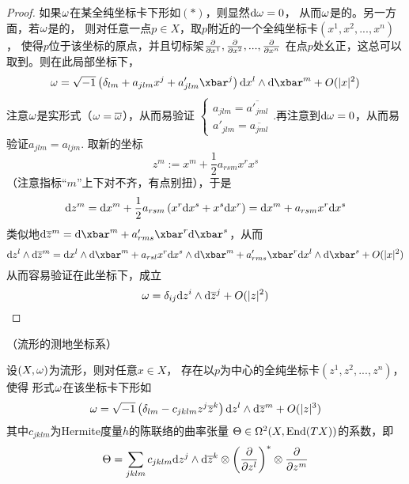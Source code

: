 
\begin{proof}
如果$\omega$在某全纯坐标卡下形如$(*)$，则显然$\mathrm{d}\omega=0$，
从而$\omega$是\Kahler 的。另一方面，若$\omega$是\Kahler 的，
则对任意一点$p\in X$，取$p$附近的一个全纯坐标卡$(x^1,x^2,...,x^n)$，
使得$p$位于该坐标的原点，并且切标架$\frac{\partial } {\partial x^1},\frac{\partial } {\partial x^2},...,\frac{\partial } {\partial x^n}$
在点$p$处幺正，这总可以取到。则在此局部坐标下，
$$
  \omg
=
  \ii\left(
    \delta_{lm}
   +a_{jlm}x^j
   +a_{jlm}'\xbar^j
  \right)
  \td x^l\wedge\td\xbar^m
  +O(|x|^2)
$$
注意$\omega$是实形式（$\omega=\overline{\omega}$），从而易验证
$
  \left\{
    \begin{array}{l}
      a_{jlm}=\overline{a'_{jml}}\\
      a'_{jlm}=\overline{a_{jml}}
    \end{array}
  \right.
$.再注意到$\mathrm{d}\omega=0$，从而易验证$a_{jlm}=a_{ljm}$.
取新的坐标
$$z^m:=x^m+\frac{1}{2}a_{rsm}x^rx^s$$
（注意指标“$m$”上下对不齐，有点别扭），于是
$$
  \mathrm{d} z^m=\mathrm{d} x^m+\frac{1}{2}
  a_{rsm}\left(x^r\mathrm{d} x^s+x^s\mathrm{d} x^r\right)
=
  \mathrm{d} x^m+a_{rsm}x^r\mathrm{d} x^s
$$
类似地$\td\zbar^m=\td\xbar^m+a'_{rms}\xbar^r\td\xbar^s$，从而
$$
  \td z^l\wedge\td\zbar^m
=
  \td x^l\wedge\td\xbar^m
 +a_{rsl}x^r\td x^s\wedge\td\xbar^m
 +a_{rms}'\xbar^r\td x^l\wedge\td\xbar^s+O(|x|^2)
$$
从而容易验证在此坐标下，成立
$$\omega=\delta_{ij}\mathrm{d} z^i\wedge\mathrm{d}\overline{z}^j+O(|z|^2)$$
\end{proof}


\begin{prop}（\Kahler 流形的测地坐标系）

设$(X,\omega)$为\Kahler 流形，则对任意$x\in X$，
存在以$p$为中心的全纯坐标卡$(z^1,z^2,...,z^n)$，使得
\Kahler 形式$\omega$在该坐标卡下形如
$$
  \omega=\sqrt{-1}
  \left(
    \delta_{lm}-c_{jklm}z^j\overline{z}^k
  \right)\mathrm{d} z^l\wedge\mathrm{d}\overline{z}^m+O(|z|^3)
$$
其中$c_{jklm}$为Hermite度量$h$的陈联络的曲率张量
$\Theta\in\Omega^2(X,\operatorname{End}(TX))$的系数，即
$$
  \Theta=\sum_{jklm}
  c_{jklm}\mathrm{d} z^j\wedge\mathrm{d}\overline{z}^k
  \otimes\left(\frac{\partial } {\partial z^l}\right)^*
  \otimes\frac{\partial } {\partial z^m}
$$
\end{prop}

